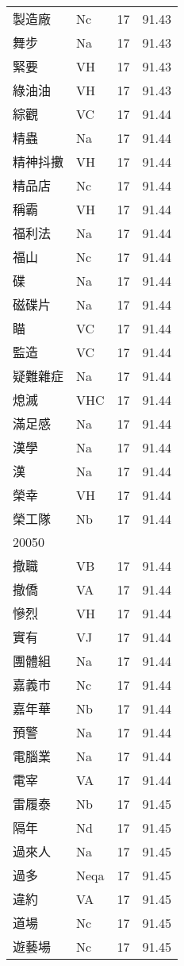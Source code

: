 \documentclass[twocolumn]{book}
\begin{document}
\begin{supertabular}{llrr}
製造廠 & Nc & 17 &  91.43\\
舞步 & Na & 17 &  91.43\\
緊要 & VH & 17 &  91.43\\
綠油油 & VH & 17 &  91.43\\
綜觀 & VC & 17 &  91.44\\
精蟲 & Na & 17 &  91.44\\
精神抖擻 & VH & 17 &  91.44\\
精品店 & Nc & 17 &  91.44\\
稱霸 & VH & 17 &  91.44\\
福利法 & Na & 17 &  91.44\\
福山 & Nc & 17 &  91.44\\
碟 & Na & 17 &  91.44\\
磁碟片 & Na & 17 &  91.44\\
瞄 & VC & 17 &  91.44\\
監造 & VC & 17 &  91.44\\
疑難雜症 & Na & 17 &  91.44\\
熄滅 & VHC & 17 &  91.44\\
滿足感 & Na & 17 &  91.44\\
漢學 & Na & 17 &  91.44\\
漢 & Na & 17 &  91.44\\
榮幸 & VH & 17 &  91.44\\
榮工隊 & Nb & 17 &  91.44\\
20050\\
撤職 & VB & 17 &  91.44\\
撤僑 & VA & 17 &  91.44\\
慘烈 & VH & 17 &  91.44\\
實有 & VJ & 17 &  91.44\\
團體組 & Na & 17 &  91.44\\
嘉義市 & Nc & 17 &  91.44\\
嘉年華 & Nb & 17 &  91.44\\
預警 & Na & 17 &  91.44\\
電腦業 & Na & 17 &  91.44\\
電宰 & VA & 17 &  91.44\\
雷履泰 & Nb & 17 &  91.45\\
隔年 & Nd & 17 &  91.45\\
過來人 & Na & 17 &  91.45\\
過多 & Neqa & 17 &  91.45\\
違約 & VA & 17 &  91.45\\
道場 & Nc & 17 &  91.45\\
遊藝場 & Nc & 17 &  91.45\\

\end{supertabular}
\end{document}
